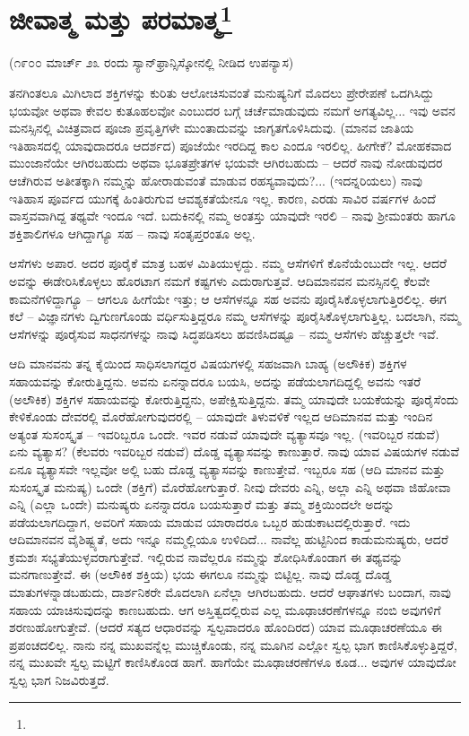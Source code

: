 
\chapter[ಜೀವಾತ್ಮ ಮತ್ತು ಪರಮಾತ್ಮ]{ಜೀವಾತ್ಮ ಮತ್ತು ಪರಮಾತ್ಮ\protect\footnote{}}

\begin{center}
(೧೯೦೦ ಮಾರ್ಚ್ ೨೩ ರಂದು ಸ್ಯಾನ್‌ಫ್ರಾನ್ಸಿಸ್ಕೋನಲ್ಲಿ ನೀಡಿದ ಉಪನ್ಯಾಸ)
\end{center}

ತನಗಿಂತಲೂ ಮಿಗಿಲಾದ ಶಕ್ತಿಗಳನ್ನು ಕುರಿತು ಆಲೋಚಿಸುವಂತೆ ಮನುಷ್ಯನಿಗೆ ಮೊದಲು ಪ್ರೇರೇಪಣೆ ಒದಗಿಸಿದ್ದು ಭಯವೋ ಅಥವಾ ಕೇವಲ ಕುತೂಹಲವೋ ಎಂಬುದರ ಬಗ್ಗೆ ಚರ್ಚೆಮಾಡುವುದು ನಮಗೆ ಅಗತ್ಯವಿಲ್ಲ... ಇವು ಅವನ ಮನಸ್ಸಿನಲ್ಲಿ ವಿಚಿತ್ರವಾದ ಪೂಜಾ ಪ್ರವೃತ್ತಿಗಳೇ ಮುಂತಾದುವನ್ನು ಜಾಗೃತಗೊಳಿಸಿದುವು. (ಮಾನವ ಜಾತಿಯ ಇತಿಹಾಸದಲ್ಲಿ ಯಾವುದಾದರೂ ಆದರ್ಶದ) ಪೂಜೆಯೇ ಇರದಿದ್ದ ಕಾಲ ಎಂದೂ ಇರಲಿಲ್ಲ. ಹೀಗೇಕೆ? ಮೋಹಕವಾದ ಮುಂಜಾನೆಯೇ ಆಗಿರಬಹುದು ಅಥವಾ ಭೂತಪ್ರೇತಗಳ ಭಯವೇ ಆಗಿರಬಹುದು – ಆದರೆ ನಾವು ನೋಡುವುದರ ಆಚೆಗಿರುವ ಅತೀತಕ್ಕಾಗಿ ನಮ್ಮನ್ನು ಹೋರಾಡುವಂತೆ ಮಾಡುವ ರಹಸ್ಯವಾವುದು?... (ಇದನ್ನರಿಯಲು) ನಾವು ಇತಿಹಾಸ ಪೂರ್ವದ ಯುಗಕ್ಕೆ ಹಿಂತಿರುಗುವ ಆವಶ್ಯಕತೆಯೇನೂ ಇಲ್ಲ. ಕಾರಣ, ಎರಡು ಸಾವಿರ ವರ್ಷಗಳ ಹಿಂದೆ ವಾಸ್ತವವಾಗಿದ್ದ ತಥ್ಯವೇ ಇಂದೂ ಇದೆ. ಬದುಕಿನಲ್ಲಿ ನಮ್ಮ ಅಂತಸ್ತು ಯಾವುದೇ ಇರಲಿ – ನಾವು ಶ‍್ರೀಮಂತರು ಹಾಗೂ ಶಕ್ತಿಶಾಲಿಗಳೂ ಆಗಿದ್ದಾಗ್ಯೂ ಸಹ – ನಾವು ಸಂತೃಪ್ತರಂತೂ ಅಲ್ಲ.

ಆಸೆಗಳು ಅಪಾರ. ಅದರ ಪೂರೈಕೆ ಮಾತ್ರ ಬಹಳ ಮಿತಿಯುಳ್ಳದ್ದು. ನಮ್ಮ ಆಸೆಗಳಿಗೆ ಕೊನೆಯೆಂಬುದೇ ಇಲ್ಲ. ಆದರೆ ಅವನ್ನು ಈಡೇರಿಸಿಕೊಳ್ಳಲು ಹೊರಟಾಗ ನಮಗೆ ಕಷ್ಟಗಳು ಎದುರಾಗುತ್ತವೆ. ಆದಿಮಾನವನ ಮನಸ್ಸಿನಲ್ಲಿ ಕೆಲವೇ ಕಾಮನೆಗಳಿದ್ದಾಗ್ಯೂ – ಆಗಲೂ ಹೀಗೆಯೇ ಇತ್ತು; ಆ ಆಸೆಗಳನ್ನೂ ಸಹ ಅವನು ಪೂರೈಸಿಕೊಳ್ಳಲಾಗುತ್ತಿರಲಿಲ್ಲ. ಈಗ ಕಲೆ – ವಿಜ್ಞಾನಗಳು ದ್ವಿಗುಣಗೊಂಡು ವರ್ಧಿಸುತ್ತಿದ್ದರೂ ನಮ್ಮ ಆಸೆಗಳನ್ನು ಪೂರೈಸಿಕೊಳ್ಳಲಾಗುತ್ತಿಲ್ಲ. ಬದಲಾಗಿ, ನಮ್ಮ ಆಸೆಗಳನ್ನು ಪೂರೈಸುವ ಸಾಧನಗಳನ್ನು ನಾವು ಸಿದ್ಧಪಡಿಸಲು ಹವಣಿಸಿದಷ್ಟೂ – ನಮ್ಮ ಆಸೆಗಳು ಹೆಚ್ಚುತ್ತಲೇ ಇವೆ.

ಆದಿ ಮಾನವನು ತನ್ನ ಕೈಯಿಂದ ಸಾಧಿಸಲಾಗದ್ದರ ವಿಷಯಗಳಲ್ಲಿ ಸಹಜವಾಗಿ ಬಾಹ್ಯ (ಅಲೌಕಿಕ) ಶಕ್ತಿಗಳ ಸಹಾಯವನ್ನು ಕೋರುತ್ತಿದ್ದನು. ಅವನು ಏನನ್ನಾದರೂ ಬಯಸಿ, ಅದನ್ನು ಪಡೆಯಲಾಗದಿದ್ದಲ್ಲಿ ಅವನು ಇತರೆ (ಅಲೌಕಿಕ) ಶಕ್ತಿಗಳ ಸಹಾಯವನ್ನು ಕೋರುತ್ತಿದ್ದನು, ಅಪೇಕ್ಷಿಸುತ್ತಿದ್ದನು. ತಮ್ಮ ಯಾವುದೇ ಬಯಕೆಯನ್ನು ಪೂರೈಸೆಂದು ಕೇಳಿಕೊಂಡು ದೇವರಲ್ಲಿ ಮೊರೆಹೋಗುವುದರಲ್ಲಿ – ಯಾವುದೇ ತಿಳುವಳಿಕೆ ಇಲ್ಲದ ಆದಿಮಾನವ ಮತ್ತು ಇಂದಿನ ಅತ್ಯಂತ ಸುಸಂಸ್ಕೃತ – ಇವರಿಬ್ಬರೂ ಒಂದೇ. ಇವರ ನಡುವೆ ಯಾವುದೇ ವ್ಯತ್ಯಾಸವೂ ಇಲ್ಲ. (ಇವರಿಬ್ಬರ ನಡುವೆ) ಏನು ವ್ಯತ್ಯಾಸ? (ಕೆಲವರು ಇವರಿಬ್ಬರ ನಡುವೆ) ದೊಡ್ಡ ವ್ಯತ್ಯಾಸವನ್ನು ಕಾಣುತ್ತಾರೆ. ನಾವು ಯಾವ ವಿಷಯಗಳ ನಡುವೆ ಏನೂ ವ್ಯತ್ಯಾಸವೇ ಇಲ್ಲವೋ ಅಲ್ಲಿ ಬಹು ದೊಡ್ಡ ವ್ಯತ್ಯಾಸವನ್ನು ಕಾಣುತ್ತೇವೆ. ಇಬ್ಬರೂ ಸಹ (ಆದಿ ಮಾನವ ಮತ್ತು ಸುಸಂಸ್ಕೃತ ಮನುಷ್ಯ) ಒಂದೇ (ಶಕ್ತಿಗೆ) ಮೊರೆಹೋಗುತ್ತಾರೆ. ನೀವು ದೇವರು ಎನ್ನಿ, ಅಲ್ಲಾ ಎನ್ನಿ ಅಥವಾ ಜಿಹೋವಾ ಎನ್ನಿ (ಎಲ್ಲಾ ಒಂದೇ) ಮನುಷ್ಯರು ಏನನ್ನಾದರೂ ಬಯಸುತ್ತಾರೆ ಮತ್ತು ತಮ್ಮ ಶಕ್ತಿಯಿಂದಲೇ ಅದನ್ನು ಪಡೆಯಲಾಗದಿದ್ದಾಗ, ಅವರಿಗೆ ಸಹಾಯ ಮಾಡುವ ಯಾರಾದರೂ ಒಬ್ಬರ ಹುಡುಕಾಟದಲ್ಲಿರುತ್ತಾರೆ. ಇದು ಆದಿಮಾನವನ ವೈಶಿಷ್ಟ್ಯತೆ, ಅದು ಇನ್ನೂ ನಮ್ಮಲ್ಲಿಯೂ ಉಳಿದಿದೆ... ನಾವೆಲ್ಲ ಹುಟ್ಟಿನಿಂದ ಕಾಡುಮನುಷ್ಯರು, ಆದರೆ ಕ್ರಮಶಃ ಸಭ್ಯತೆಯುಳ್ಳವರಾಗುತ್ತೇವೆ. ಇಲ್ಲಿರುವ ನಾವೆಲ್ಲರೂ ನಮ್ಮನ್ನು ಶೋಧಿಸಿಕೊಂಡಾಗ ಈ ತಥ್ಯವನ್ನು ಮನಗಾಣುತ್ತೇವೆ. ಈ (ಅಲೌಕಿಕ ಶಕ್ತಿಯ) ಭಯ ಈಗಲೂ ನಮ್ಮನ್ನು ಬಿಟ್ಟಿಲ್ಲ. ನಾವು ದೊಡ್ಡ ದೊಡ್ಡ ಮಾತುಗಳನ್ನಾಡಬಹುದು, ದಾರ್ಶನಿಕರೇ ಮೊದಲಾಗಿ ಏನೆಲ್ಲಾ ಆಗಿರಬಹುದು. ಆದರೆ ಆಘಾತಗಳು ಬಂದಾಗ, ನಾವು ಸಹಾಯ ಯಾಚಿಸುವುದನ್ನು ಕಾಣಬಹುದು. ಆಗ ಅಸ್ತಿತ್ವದಲ್ಲಿರುವ ಎಲ್ಲ ಮೂಢಾಚರಣೆಗಳನ್ನೂ ನಂಬಿ ಅವುಗಳಿಗೆ ಶರಣುಹೋಗುತ್ತೇವೆ. (ಆದರೆ ಸತ್ಯದ ಆಧಾರವನ್ನು ಸ್ವಲ್ಪವಾದರೂ ಹೊಂದಿರದ) ಯಾವ ಮೂಢಾಚರಣೆಯೂ ಈ ಪ್ರಪಂಚದಲಿಲ್ಲ. ನಾನು ನನ್ನ ಮುಖವನ್ನೆಲ್ಲ ಮುಚ್ಚಿಕೊಂಡು, ನನ್ನ ಮೂಗಿನ ಎಲ್ಲೋ ಸ್ವಲ್ಪ ಭಾಗ ಕಾಣಿಸಿಕೊಳ್ಳುತ್ತಿದ್ದರೆ, ನನ್ನ ಮುಖವೇ ಸ್ವಲ್ಪ ಮಟ್ಟಿಗೆ ಕಾಣಿಸಿಕೊಂಡ ಹಾಗೆ. ಹಾಗೆಯೇ ಮೂಢಾಚರಣೆಗಳೂ ಕೂಡ... ಅವುಗಳ ಯಾವುದೋ ಸ್ವಲ್ಪ ಭಾಗ ನಿಜವಿರುತ್ತದೆ.

